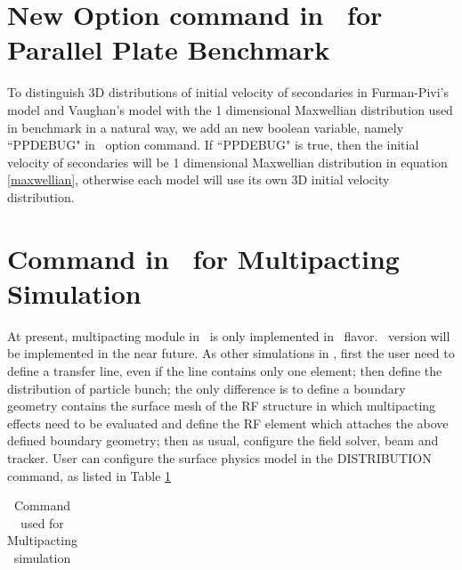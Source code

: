 \documentclass[a4paper,11pt]{article}
\begin{document}
\begin{appendices}
\section{New Option command in \opal\ for Parallel Plate Benchmark }
To distinguish 3D distributions of initial velocity of secondaries in Furman-Pivi's model and Vaughan's model with the 1 dimensional Maxwellian distribution used in benchmark in a natural way, we add an new boolean variable,  namely ``PPDEBUG" in \opal\ option command. If ``PPDEBUG" is true, then the initial velocity of secondaries will be 1 dimensional Maxwellian distribution in equation \eqref{maxwellian}, otherwise each model will use its own 3D initial velocity distribution. 
\section{Command in \opal\ for Multipacting Simulation}
At present, multipacting module in \opal\ is only implemented in \opalt\ flavor. \opalcycl\ version will be implemented in the near future. As other simulations in \opalt, first the user need to define a transfer line, even if the line contains only one element; then define the distribution of particle bunch; the only difference is to define a boundary geometry contains the surface mesh of the RF structure in which multipacting effects need to be evaluated and define the RF element which attaches the above defined boundary geometry; then as usual, configure the field solver, beam and tracker.       
User can configure the surface physics model in the DISTRIBUTION command, as listed in Table \ref{my_table2} 
\begin{table}[H]\footnotesize
{\renewcommand{\arraystretch}{1.5}
\renewcommand{\tabcolsep}{0.2cm}}
\caption{Command used for Multipacting simulation}
\centering
  \label{my_table2}
  \begin{tabular}{lccc}%


\end{tabular}
\end{table}
\end{appendices}
\end{document}
